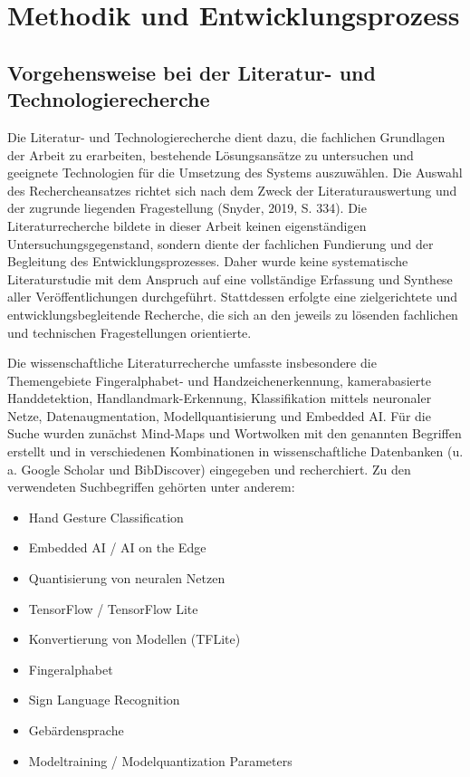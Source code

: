 \chapter{Methodik und Entwicklungsprozess}

\section{Vorgehensweise bei der Literatur- und Technologierecherche}

Die Literatur- und Technologierecherche dient dazu, die fachlichen Grundlagen der Arbeit zu erarbeiten, bestehende Lösungsansätze zu untersuchen und geeignete Technologien für die Umsetzung des Systems auszuwählen. Die Auswahl des Rechercheansatzes richtet sich nach dem Zweck der Literaturauswertung und der zugrunde liegenden Fragestellung (Snyder, 2019, S. 334). Die Literaturrecherche bildete in dieser Arbeit keinen eigenständigen Untersuchungsgegenstand, sondern diente der fachlichen Fundierung und der Begleitung des Entwicklungsprozesses. Daher wurde keine systematische Literaturstudie mit dem Anspruch auf eine vollständige Erfassung und Synthese aller Veröffentlichungen durchgeführt. Stattdessen erfolgte eine zielgerichtete und entwicklungsbegleitende Recherche, die sich an den jeweils zu lösenden fachlichen und technischen Fragestellungen orientierte.

Die wissenschaftliche Literaturrecherche umfasste insbesondere die Themengebiete Fingeralphabet- und Handzeichenerkennung, kamerabasierte Handdetektion, Handlandmark-Erkennung, Klassifikation mittels neuronaler Netze, Datenaugmentation, Modellquantisierung und Embedded AI. Für die Suche wurden zunächst Mind-Maps und Wortwolken mit den genannten Begriffen erstellt und in verschiedenen Kombinationen in wissenschaftliche Datenbanken (u. a. Google Scholar und BibDiscover) eingegeben und recherchiert. Zu den verwendeten Suchbegriffen gehörten unter anderem:

\begin{itemize}
    \item Hand Gesture Classification
    \item Embedded AI / AI on the Edge
    \item Quantisierung von neuralen Netzen
    \item TensorFlow / TensorFlow Lite
    \item Konvertierung von Modellen (TFLite)
    \item Fingeralphabet
    \item Sign Language Recognition
    \item Gebärdensprache
    \item Modeltraining / Modelquantization Parameters
\end{itemize}

